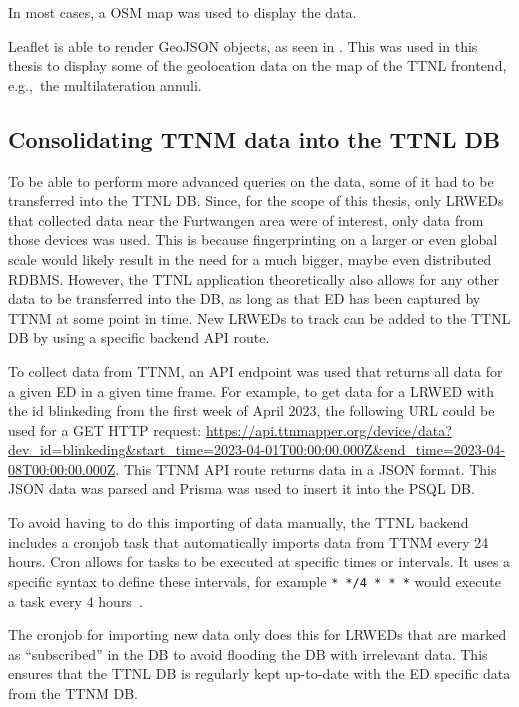 In most cases, a \ac{OSM} map was used to display the data.

Leaflet is able to render GeoJSON objects, as seen in .
This was used in this thesis to display some of the geolocation data on the map of the \ac{TTNL} frontend, e.g.,\ the multilateration annuli.

\subsection{Consolidating \acl{TTNM} data into the \acl{TTNL} \acl{DB}}\label{sec:consolidating-ttnm-data-into-ttnl-db}

To be able to perform more advanced queries on the data, some of it had to be transferred into the \ac{TTNL} \acl{DB}.
Since, for the scope of this thesis, only \aclp{LRWED} that collected data near the Furtwangen area were of interest, only data from those devices was used.
This is because fingerprinting on a larger or even global scale would likely result in the need for a much bigger, maybe even distributed \ac{RDBMS}.
However, the \ac{TTNL} application theoretically also allows for any other data to be transferred into the \ac{DB}, as long as that \acl{ED} has been captured by \ac{TTNM} at some point in time.
New \aclp{LRWED} to track can be added to the \ac{TTNL} \ac{DB} by using a specific backend \ac{API} route.

To collect data from \ac{TTNM}, an \ac{API} endpoint was used that returns all data for a given \acl{ED} in a given time frame.
For example, to get data for a \acl{LRWED} with the id blinkeding from the first week of April 2023, the following \ac{URL} could be used for a GET \ac{HTTP} request: \url{https://api.ttnmapper.org/device/data?dev_id=blinkeding&start_time=2023-04-01T00:00:00.000Z&end_time=2023-04-08T00:00:00.000Z}.
This \ac{TTNM} \ac{API} route returns data in a \ac{JSON} format.
This \ac{JSON} data was parsed and Prisma was used to insert it into the \ac{PSQL} \ac{DB}.

To avoid having to do this importing of data manually, the \ac{TTNL} backend includes a cronjob task that automatically imports data from \ac{TTNM} every 24 hours.
Cron allows for tasks to be executed at specific times or intervals.
It uses a specific syntax to define these intervals, for example \texttt{* */4 * * *} would execute a task every 4 hours~\cite{drake_how_2020}.

The cronjob for importing new data only does this for \aclp{LRWED} that are marked as ``subscribed'' in the \ac{DB} to avoid flooding the \ac{DB} with irrelevant data.
This ensures that the \ac{TTNL} \ac{DB} is regularly kept up-to-date with the \acl{ED} specific data from the \ac{TTNM} \ac{DB}.

